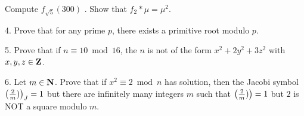  Compute $f_{\sqrt{5}}(300)$ .\vv
{} Show that $f_2*\mu=\mu^2$.\ve\vs

\item{4.} Prove that for any prime $p$, there exists a primitive root modulo $p$.\vv

\item{5.} Prove that if $n\equiv10\bmod16$, the $n$ is not of the form $x^2+2y^2+3z^2$ with $x,y,z\in{\bf Z}$.\ve \vs

\item{6.} Let $m\in{\bf N}$. Prove that if $x^2\equiv2\bmod n$ has solution, then the Jacobi symbol $\left({2\over m})\right)_J=1$ but 
there are infinitely many integers $m$ such that $\left({2\over m})\right)=1$ but $2$ is NOT a square modulo $m$.
\ \vst\bye
